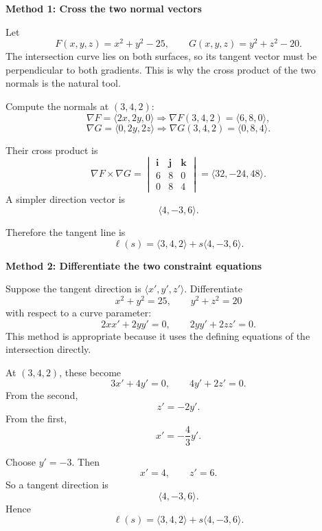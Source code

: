 \documentclass[a4paper,12pt,twocolumn]{article}
\newenvironment{solutionbox}{\begin{framed}}{\end{framed}}
\begin{document}
\begin{solutionbox}
\textbf{Method 1: Cross the two normal vectors}

\begin{steps}
\item Let
\[
F(x,y,z)=x^2+y^2-25,\qquad G(x,y,z)=y^2+z^2-20.
\]
The intersection curve lies on both surfaces, so its tangent vector must be perpendicular to both gradients. This is why the cross product of the two normals is the natural tool.

\item Compute the normals at \((3,4,2)\):
\[
\nabla F=\langle 2x,2y,0\rangle \Rightarrow \nabla F(3,4,2)=\langle 6,8,0\rangle,
\]
\[
\nabla G=\langle 0,2y,2z\rangle \Rightarrow \nabla G(3,4,2)=\langle 0,8,4\rangle.
\]

\item Their cross product is
\[
\nabla F\times \nabla G
=
\begin{vmatrix}
\mathbf i & \mathbf j & \mathbf k\\
6 & 8 & 0\\
0 & 8 & 4
\end{vmatrix}
=\langle 32,-24,48\rangle.
\]
A simpler direction vector is
\[
\langle 4,-3,6\rangle.
\]

\item Therefore the tangent line is
\[
\boxed{\ell(s)=\langle 3,4,2\rangle+s\langle 4,-3,6\rangle.}
\]
\end{steps}
\end{solutionbox}

\begin{solutionbox}
\textbf{Method 2: Differentiate the two constraint equations}

\begin{steps}
\item Suppose the tangent direction is \(\langle x',y',z'\rangle\). Differentiate
\[
x^2+y^2=25,\qquad y^2+z^2=20
\]
with respect to a curve parameter:
\[
2xx'+2yy'=0,\qquad 2yy'+2zz'=0.
\]
This method is appropriate because it uses the defining equations of the intersection directly.

\item At \((3,4,2)\), these become
\[
3x'+4y'=0,\qquad 4y'+2z'=0.
\]
From the second,
\[
z'=-2y'.
\]
From the first,
\[
x'=-\frac43 y'.
\]

\item Choose \(y'=-3\). Then
\[
x'=4,\qquad z'=6.
\]
So a tangent direction is
\[
\langle 4,-3,6\rangle.
\]
Hence
\[
\boxed{\ell(s)=\langle 3,4,2\rangle+s\langle 4,-3,6\rangle.}
\]
\end{steps}
\end{solutionbox}
\end{document}
